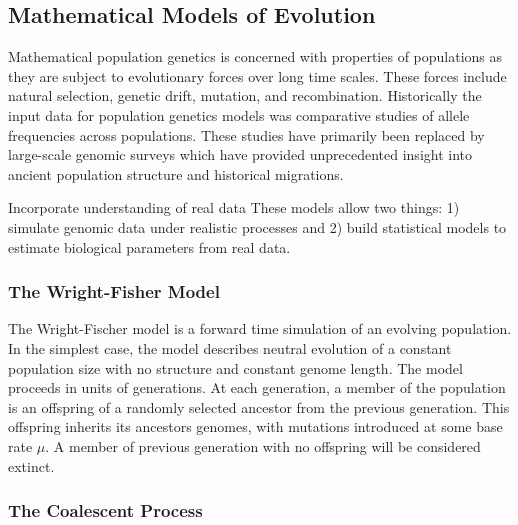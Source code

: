 \subsection{Mathematical Models of Evolution}

Mathematical population genetics is concerned with properties of populations as they are subject to evolutionary forces over long time scales.
These forces include natural selection, genetic drift, mutation, and recombination.
Historically the input data for population genetics models was comparative studies of allele frequencies across populations.
These studies have primarily been replaced by large-scale genomic surveys which have provided unprecedented insight into ancient population structure and historical migrations.

Incorporate understanding of real data
These models allow two things: 1) simulate genomic data under realistic processes and 2) build statistical models to estimate biological parameters from real data.

\subsubsection{The Wright-Fisher Model}

The Wright-Fischer model is a forward time simulation of an evolving population.
In the simplest case, the model describes neutral evolution of a constant population size with no structure and constant genome length.
The model proceeds in units of generations.
At each generation, a member of the population is an offspring of a randomly selected ancestor from the previous generation.
This offspring inherits its ancestors genomes, with mutations introduced at some base rate $\mu$.
A member of previous generation with no offspring will be considered extinct.

\subsubsection{The Coalescent Process}

